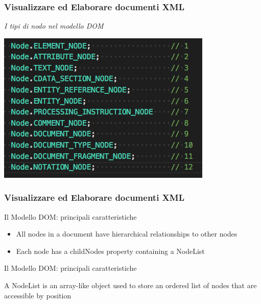 \begin{frame}
    \frametitle{Visualizzare ed Elaborare documenti XML}
    \addtocounter{nframe}{1}
    

     \textit{I tipi di nodo nel modello DOM}

        \begin{center}
            \includegraphics[width=.9\textwidth]{imgs/nodetypes.png}
        \end{center}
     
\end{frame}

\begin{frame}
    \frametitle{Visualizzare ed Elaborare documenti XML}
    \addtocounter{nframe}{1}
    

     \begin{block}{Il Modello DOM: principali caratteristiche}
        \begin{itemize}
            \item All nodes in a document have hierarchical relationships to other nodes
            \item Each node has a childNodes property containing a NodeList
        \end{itemize}
     \end{block}

     \begin{block}{Il Modello DOM: principali caratteristiche}
        \begin{itemize}
            A NodeList is an array-like object used to store an ordered list of nodes that are accessible by position
        \end{itemize}
     \end{block}

\end{frame}

